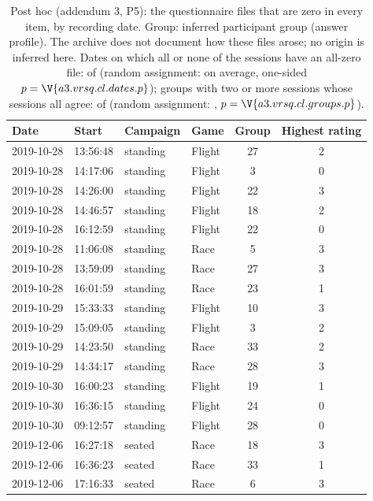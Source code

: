 \begin{table}[ht]
\centering
\scriptsize
\caption{Post hoc (addendum 3, P5): the  questionnaire files that are zero in every item, by recording date. Group: inferred participant group (answer profile). The archive does not document how these files arose; no origin is inferred here. Dates on which all or none of the sessions have an all-zero file:  of  (random assignment:  on average, one-sided $p=\V{a3.vrsq.cl.dates.p}$); groups with two or more sessions whose sessions all agree:  of  (random assignment: , $p=\V{a3.vrsq.cl.groups.p}$).}
\label{tab:a3_allzero}
\setlength{\tabcolsep}{3pt}
\begin{tabular}{@{}llllcc@{}}
\toprule
Date & Start & Campaign & Game & Group & Highest rating \\
\midrule
2019-10-28 & 13:56:48 & standing & Flight & 27 & 2 \\
2019-10-28 & 14:17:06 & standing & Flight & 3 & 0 \\
2019-10-28 & 14:26:00 & standing & Flight & 22 & 3 \\
2019-10-28 & 14:46:57 & standing & Flight & 18 & 2 \\
2019-10-28 & 16:12:59 & standing & Flight & 22 & 0 \\
2019-10-28 & 11:06:08 & standing & Race & 5 & 3 \\
2019-10-28 & 13:59:09 & standing & Race & 27 & 3 \\
2019-10-28 & 16:01:59 & standing & Race & 23 & 1 \\
2019-10-29 & 15:33:33 & standing & Flight & 10 & 3 \\
2019-10-29 & 15:09:05 & standing & Flight & 3 & 2 \\
2019-10-29 & 14:23:50 & standing & Race & 33 & 2 \\
2019-10-29 & 14:34:17 & standing & Race & 28 & 3 \\
2019-10-30 & 16:00:23 & standing & Flight & 19 & 1 \\
2019-10-30 & 16:36:15 & standing & Flight & 24 & 0 \\
2019-10-30 & 09:12:57 & standing & Flight & 28 & 0 \\
2019-12-06 & 16:27:18 & seated & Race & 18 & 3 \\
2019-12-06 & 16:36:23 & seated & Race & 33 & 1 \\
2019-12-06 & 17:16:33 & seated & Race & 6 & 3 \\

\end{tabular}
\end{table}
